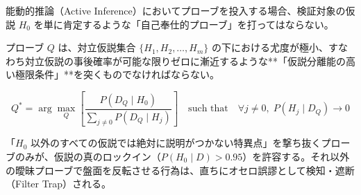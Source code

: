 \begin{enumerate}[label=\textbf{\arabic*.}]
    能動的推論（Active Inference）においてプローブを投入する場合、検証対象の仮説 $H_0$ を単に肯定するような「自己奉仕的プローブ」を打ってはならない。
    
    プローブ $Q$ は、対立仮説集合 $\{H_1, H_2, \dots, H_m\}$ の下における尤度が極小、すなわち対立仮説の事後確率が可能な限りゼロに漸近するような**「仮説分離能の高い極限条件」**を突くものでなければならない。

    \begin{equation}
        Q^* = \arg\max_{Q} \left[ \frac{P(D_Q \mid H_0)}{\sum_{j \neq 0} P(D_Q \mid H_j)} \right] \quad \text{such that} \quad \forall j \neq 0, \; P(H_j \mid D_Q) \to 0
    \end{equation}

    「$H_0$ 以外のすべての仮説では絶対に説明がつかない特異点」を撃ち抜くプローブのみが、仮説の真のロックイン（$P(H_0 \mid D) > 0.95$）を許容する。それ以外の曖昧プローブで盤面を反転させる行為は、直ちにオセロ誤謬として検知・遮断（Filter Trap）される。
\end{enumerate}

